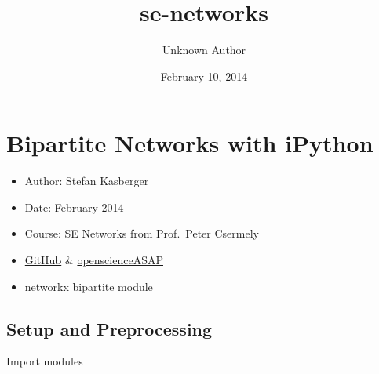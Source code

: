 \documentclass[letterpaper,10pt,english]{/usr/local/lib/python2.7/dist-packages/sphinx/texinputs/sphinxhowto}
\title{se-networks}
\date{February 10, 2014}
\author{Unknown Author}
\begin{document}
        
            \maketitle
        

        


        
        \section{Bipartite Networks with iPython}

\begin{itemize}
\itemsep1pt\parskip0pt
\item
  Author: Stefan Kasberger
\item
  Date: February 2014
\item
  Course: SE Networks from Prof.~Peter Csermely
\item
  \href{https://github.com/skasberger/se-networks}{GitHub} \&
  \href{http://openscienceasap.org/education/courses/se-networks/}{openscienceASAP}
\item
  \href{http://networkx.lanl.gov/reference/algorithms.bipartite.html}{networkx
  bipartite module}
\end{itemize}\subsection{Setup and Preprocessing}Import modules

\end{document}
